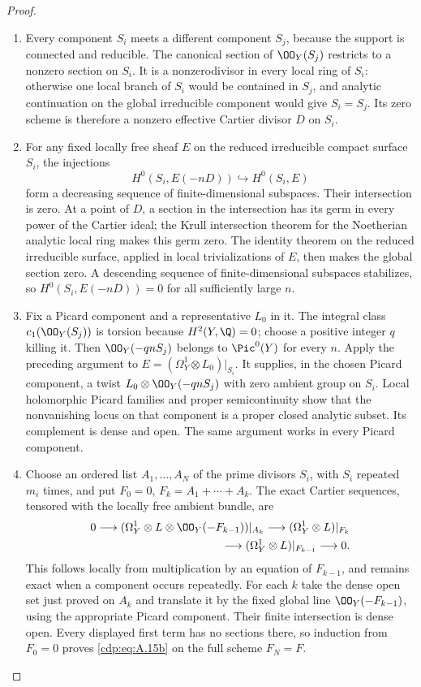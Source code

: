 \begin{proof}

\begin{enumerate}[label=\arabic*.,leftmargin=*]
\item Every component $S_i$ meets a different component $S_j$, because the support is connected and reducible. The canonical section of $\OO_Y(S_j)$ restricts to a nonzero section on $S_i$. It is a nonzerodivisor in every local ring of $S_i$: otherwise one local branch of $S_i$ would be contained in $S_j$, and analytic continuation on the global irreducible component would give $S_i=S_j$. Its zero scheme is therefore a nonzero effective Cartier divisor $D$ on $S_i$.

\item For any fixed locally free sheaf $E$ on the reduced irreducible compact surface $S_i$, the injections
\[
 H^0(S_i,E(-nD))\hookrightarrow H^0(S_i,E)
\]
form a decreasing sequence of finite-dimensional subspaces. Their intersection is zero. At a point of $D$, a section in the intersection has its germ in every power of the Cartier ideal; the Krull intersection theorem for the Noetherian analytic local ring makes this germ zero. The identity theorem on the reduced irreducible surface, applied in local trivializations of $E$, then makes the global section zero. A descending sequence of finite-dimensional subspaces stabilizes, so $H^0(S_i,E(-nD))=0$ for all sufficiently large $n$.

\item Fix a Picard component and a representative $L_0$ in it. The integral class $c_1(\OO_Y(S_j))$ is torsion because $H^2(Y,\Q)=0$; choose a positive integer $q$ killing it. Then $\OO_Y(-qnS_j)$ belongs to $\Pic^0(Y)$ for every $n$. Apply the preceding argument to $E=(\Omega_Y^1\otimes L_0)|_{S_i}$. It supplies, in the chosen Picard component, a twist $L_0\otimes\OO_Y(-qnS_j)$ with zero ambient group on $S_i$. Local holomorphic Picard families and proper semicontinuity show that the nonvanishing locus on that component is a proper closed analytic subset. Its complement is dense and open. The same argument works in every Picard component.

\item Choose an ordered list $A_1,\ldots,A_N$ of the prime divisors $S_i$, with $S_i$ repeated $m_i$ times, and put $F_0=0$, $F_k=A_1+\cdots+A_k$. The exact Cartier sequences, tensored with the locally free ambient bundle, are
\[
\begin{split}
0\longrightarrow
 (\Omega_Y^1\otimes L\otimes\OO_Y(-F_{k-1}))|_{A_k}
 \longrightarrow (\Omega_Y^1\otimes L)|_{F_k}\\
 \longrightarrow(\Omega_Y^1\otimes L)|_{F_{k-1}}
 \longrightarrow0.
\end{split}
\]
This follows locally from multiplication by an equation of $F_{k-1}$, and remains exact when a component occurs repeatedly. For each $k$ take the dense open set just proved on $A_k$ and translate it by the fixed global line $\OO_Y(-F_{k-1})$, using the appropriate Picard component. Their finite intersection is dense open. Every displayed first term has no sections there, so induction from $F_0=0$ proves \eqref{cdp:eq:A.15b} on the full scheme $F_N=F$.


\end{enumerate}
\end{proof}
